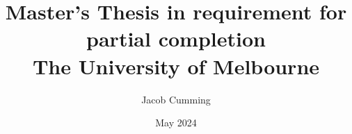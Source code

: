 \documentclass{book}
\begin{document}

\title{
{Master's Thesis in requirement for partial completion}\\
{\large The University of Melbourne}
}
\date{May 2024}
\author{Jacob Cumming}

\maketitle
{}
\tableofcontents

\listoffigures

% 
% 


\newpage

% 








% 

% 


\printbibliography
\end{document}
